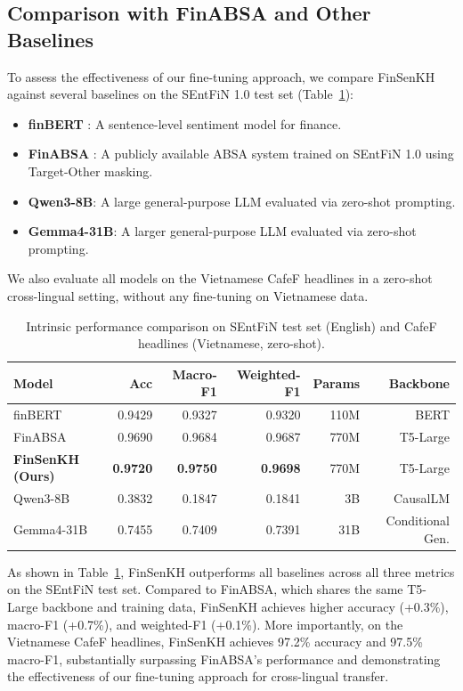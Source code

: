 \documentclass[12pt,a4paper]{article}
\begin{document}
\subsection{Comparison with FinABSA and Other Baselines}
\label{subsec:model-comparison}

To assess the effectiveness of our fine-tuning approach, we compare FinSenKH against several baselines on the SEntFiN 1.0 test set (Table~\ref{tab:model-comparison}):
\begin{itemize}
    \item \textbf{finBERT} \cite{finbert}: A sentence-level sentiment model for finance.
    \item \textbf{FinABSA} \cite{son2023removing}: A publicly available ABSA system trained on SEntFiN 1.0 using Target-Other masking.
    \item \textbf{Qwen3-8B}: A large general-purpose LLM evaluated via zero-shot prompting.
    \item \textbf{Gemma4-31B}: A larger general-purpose LLM evaluated via zero-shot prompting.
\end{itemize}

We also evaluate all models on the Vietnamese CafeF headlines in a zero-shot cross-lingual setting, without any fine-tuning on Vietnamese data.
\begin{table}[H]
\centering
\small
\setlength{\tabcolsep}{4pt}
\caption{Intrinsic performance comparison on SEntFiN test set (English) and CafeF headlines (Vietnamese, zero-shot).}
\label{tab:model-comparison}
\begin{tabular}{lrrrrr}
\toprule
\textbf{Model} & \textbf{Acc} & \textbf{Macro-F1} & \textbf{Weighted-F1} & \textbf{Params} & \textbf{Backbone} \\
\midrule
finBERT & 0.9429 & 0.9327 & 0.9320 & 110M & BERT \\
FinABSA & 0.9690 & 0.9684 & 0.9687 & 770M & T5-Large \\
\textbf{FinSenKH (Ours)} & \textbf{0.9720} & \textbf{0.9750} & \textbf{0.9698} & 770M & T5-Large \\
Qwen3-8B & 0.3832 & 0.1847 & 0.1841 & 3B & CausalLM \\
Gemma4-31B & 0.7455 & 0.7409 & 0.7391 & 31B & Conditional Gen. \\
\bottomrule
\end{tabular}
\end{table}

As shown in Table~\ref{tab:model-comparison}, FinSenKH outperforms all baselines across all three metrics on the SEntFiN test set. Compared to FinABSA, which shares the same T5-Large backbone and training data, FinSenKH achieves higher accuracy (+0.3\%), macro-F1 (+0.7\%), and weighted-F1 (+0.1\%). More importantly, on the Vietnamese CafeF headlines, FinSenKH achieves 97.2\% accuracy and 97.5\% macro-F1, substantially surpassing FinABSA's performance and demonstrating the effectiveness of our fine-tuning approach for cross-lingual transfer.
\end{document}
